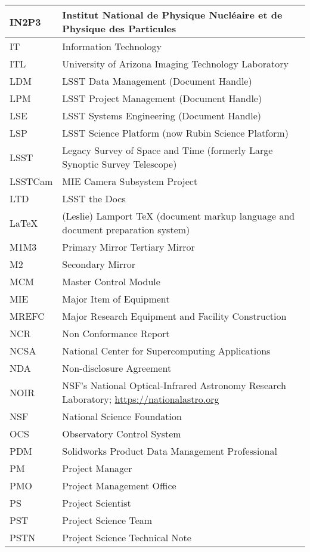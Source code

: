 \begin{longtable}{p{}p{}}
IN2P3 & Institut National de Physique Nucléaire et de Physique des Particules \\\hline
IT & Information Technology \\\hline
ITL & University of Arizona Imaging Technology Laboratory \\\hline
LDM & LSST Data Management (Document Handle) \\\hline
LPM & LSST Project Management (Document Handle) \\\hline
LSE & LSST Systems Engineering (Document Handle) \\\hline
LSP & LSST Science Platform (now Rubin Science Platform) \\\hline
LSST & Legacy Survey of Space and Time (formerly Large Synoptic Survey Telescope) \\\hline
LSSTCam & MIE Camera Subsystem Project \\\hline
LTD & LSST the Docs \\\hline
LaTeX & (Leslie) Lamport TeX (document markup language and document preparation system) \\\hline
M1M3 & Primary Mirror Tertiary Mirror \\\hline
M2 & Secondary Mirror \\\hline
MCM & Master Control Module \\\hline
MIE & Major Item of Equipment \\\hline
MREFC & Major Research Equipment and Facility Construction \\\hline
NCR & Non Conformance Report \\\hline
NCSA & National Center for Supercomputing Applications \\\hline
NDA & Non-disclosure Agreement \\\hline
NOIR & NSF's National Optical-Infrared Astronomy Research Laboratory; \url{https://nationalastro.org} \\\hline
NSF & National Science Foundation \\\hline
OCS & Observatory Control System \\\hline
PDM & Solidworks Product Data Management Professional \\\hline
PM & Project Manager \\\hline
PMO & Project Management Office \\\hline
PS & Project Scientist \\\hline
PST & Project Science Team \\\hline
PSTN & Project Science Technical Note \\\hline

\end{longtable}

